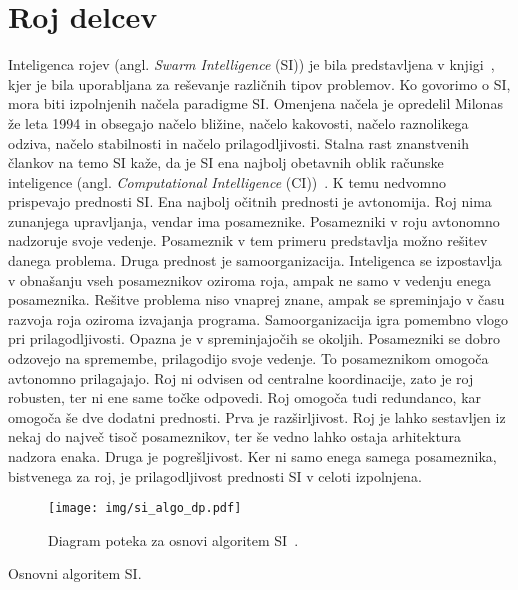 \section{Roj delcev}

Inteligenca rojev (angl. \textit{Swarm Intelligence} (SI)) je bila predstavljena v knjigi~\cite{bib:swarm_intelligence}, kjer je bila uporabljana za reševanje različnih tipov problemov.
Ko govorimo o SI, mora biti izpolnjenih načela paradigme SI.
Omenjena načela je opredelil Milonas~\cite{bib:si_principles} že leta 1994 in obsegajo načelo bližine, načelo kakovosti, načelo raznolikega odziva, načelo stabilnosti in načelo prilagodljivosti.
Stalna rast znanstvenih člankov na temo SI kaže, da je SI ena najbolj obetavnih oblik računske inteligence (angl. \textit{Computational Intelligence} (CI))~\cite{bib:computational_intelligence}.
K temu nedvomno prispevajo prednosti SI.
Ena najbolj očitnih prednosti je avtonomija.
Roj nima zunanjega upravljanja, vendar ima posameznike.
Posamezniki v roju avtonomno nadzoruje svoje vedenje.
Posameznik v tem primeru predstavlja možno rešitev danega problema.
Druga prednost je samoorganizacija.
Inteligenca se izpostavlja v obnašanju vseh posameznikov oziroma roja, ampak ne samo v vedenju enega posameznika.
Rešitve problema niso vnaprej znane, ampak se spreminjajo v času razvoja roja oziroma izvajanja programa.
Samoorganizacija igra pomembno vlogo pri prilagodljivosti.
Opazna je v spreminjajočih se okoljih.
Posamezniki se dobro odzovejo na spremembe, prilagodijo svoje vedenje.
To posameznikom omogoča avtonomno prilagajajo.
Roj ni odvisen od centralne koordinacije, zato je roj robusten, ter ni ene same točke odpovedi.
Roj omogoča tudi redundanco, kar omogoča še dve dodatni prednosti.
Prva je razširljivost.
Roj je lahko sestavljen iz nekaj do največ tisoč posameznikov, ter še vedno lahko ostaja arhitektura nadzora enaka.
Druga je pogrešljivost.
Ker ni samo enega samega posameznika, bistvenega za roj, je prilagodljivost prednosti SI v celoti izpolnjena.

\begin{figure}[ht]
    \centering
    \texttt{[image: img/si\_algo\_dp.pdf]}
    \caption{Diagram poteka za osnovi algoritem SI~\cite{bib:swarm_intelligence}.}\label{fig:si_algo_dp}
\end{figure}

\begin{algorithm}
    \DontPrintSemicolon


    \caption{Osnovni algoritem SI.}\label{pcode:si_base}
\end{algorithm}


